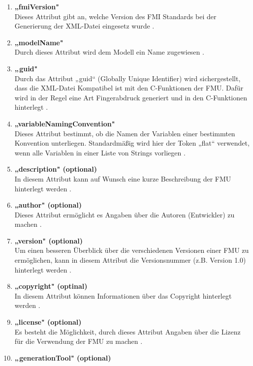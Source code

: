 \begin{enumerate}
	\item \textbf{„fmiVersion"} \cite[S.33]{25} \\
	Dieses Attribut gibt an, welche Version des FMI Standards bei der Generierung der XML-Datei
	eingesetz wurde \cite[S.33]{25}.
	\item \textbf{„modelName"} \cite[S.33]{25} \\
	Durch dieses Attribut wird dem Modell ein Name zugewiesen \cite[S.33]{25}.
	\item \textbf{„guid"} \cite[S.33]{25} \\
	Durch das Attribut „guid“ (Globally Unique Identifier) wird sichergestellt, dass die XML-Datei 
	Kompatibel ist mit den C-Funktionen der FMU. Dafür wird in der Regel eine Art Fingerabdruck
	generiert und in den C-Funktionen hinterlegt \cite[S.33]{25}.
	\item \textbf{„variableNamingConvention"} \cite[S.33]{25} \\
	Dieses Attribut bestimmt, ob die Namen der Variablen einer bestimmten Konvention 
	unterliegen. Standardmäßig wird hier der Token „flat“ verwendet, wenn alle Variablen
	in einer Liste von Strings vorliegen \cite[S.33]{25}.
	\item \textbf{„description" (optional)} \cite[S.33]{25} \\
	In diesem Attribut kann auf Wunsch eine kurze Beschreibung der FMU hinterlegt werden \cite[S.33]{25}.
	\item \textbf{„author" (optional)} \cite[S.33]{25} \\
	Dieses Attribut ermöglicht es Angaben über die Autoren (Entwickler) zu machen \cite[S.33]{25}.
	\item \textbf{„version" (optional)} \cite[S.33]{25} \\
	Um einen besseren Überblick über die verschiedenen Versionen einer FMU zu ermöglichen,
	kann in diesem Attribut die Versionsnummer (z.B. Version 1.0) hinterlegt werden \cite[S.33]{25}.
	\item \textbf{„copyright" (optinal)} \cite[S.33]{25} \\
	In diesem Attribut können Informationen über das Copyright hinterlegt werden \cite[S.33]{25}.
	\item \textbf{„license" (optional)} \cite[S.33]{25} \\
	Es besteht die Möglichkeit, durch dieses Attribut Angaben über die Lizenz für die Verwendung
	der FMU zu machen \cite[S.33]{25}.
	\item \textbf{„generationTool" (optional)} \cite[S.33]{25} \\

\end{enumerate}
